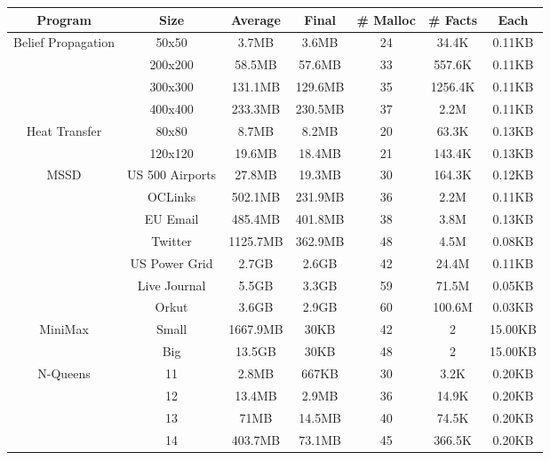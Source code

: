 \begin{tabular}{c | c || c | c | c || c c} \hline
	\textbf{Program} & \textbf{Size} & \textbf{Average} & \textbf{Final} & \textbf{\# Malloc} & \textbf{\# Facts} & \textbf{Each} \\ \hline \hline
	\multirow{4}{*}{Belief Propagation}  & 50x50 & 3.7MB & 3.6MB & 24 & 34.4K & 0.11KB \\
		 & 200x200 & 58.5MB & 57.6MB & 33 & 557.6K & 0.11KB \\
		 & 300x300 & 131.1MB & 129.6MB & 35 & 1256.4K & 0.11KB \\
		 & 400x400 & 233.3MB & 230.5MB & 37 & 2.2M & 0.11KB \\
	\hline
	\multirow{2}{*}{Heat Transfer}  & 80x80 & 8.7MB & 8.2MB & 20 & 63.3K & 0.13KB \\
		 & 120x120 & 19.6MB & 18.4MB & 21 & 143.4K & 0.13KB \\
	\hline
	\multirow{7}{*}{MSSD}  & US 500 Airports & 27.8MB & 19.3MB & 30 & 164.3K & 0.12KB \\
		 & OCLinks & 502.1MB & 231.9MB & 36 & 2.2M & 0.11KB \\
		 & EU Email & 485.4MB & 401.8MB & 38 & 3.8M & 0.13KB \\
		 & Twitter & 1125.7MB & 362.9MB & 48 & 4.5M & 0.08KB \\
		 & US Power Grid & 2.7GB & 2.6GB & 42 & 24.4M & 0.11KB \\
		 & Live Journal & 5.5GB & 3.3GB & 59 & 71.5M & 0.05KB \\
		 & Orkut & 3.6GB & 2.9GB & 60 & 100.6M & 0.03KB \\
	\hline
	\multirow{2}{*}{MiniMax}  & Small & 1667.9MB & 30KB & 42 & 2 & 15.00KB \\
		 & Big & 13.5GB & 30KB & 48 & 2 & 15.00KB \\
	\hline
	\multirow{4}{*}{N-Queens}  & 11 & 2.8MB & 667KB & 30 & 3.2K & 0.20KB \\
		 & 12 & 13.4MB & 2.9MB & 36 & 14.9K & 0.20KB \\
		 & 13 & 71MB & 14.5MB & 40 & 74.5K & 0.20KB \\
		 & 14 & 403.7MB & 73.1MB & 45 & 366.5K & 0.20KB \\
	\hline
\end{tabular}
